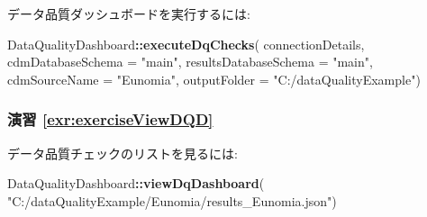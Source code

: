 \documentclass[
  11pt]{book}
\newenvironment{Shaded}{\begin{snugshade}}{\end{snugshade}}
\newcommand{\AttributeTok}[1]{\textcolor[rgb]{0.13,0.29,0.53}{#1}}
\newcommand{\FunctionTok}[1]{\textcolor[rgb]{0.13,0.29,0.53}{\textbf{#1}}}
\newcommand{\NormalTok}[1]{#1}
\newcommand{\SpecialCharTok}[1]{\textcolor[rgb]{0.81,0.36,0.00}{\textbf{#1}}}
\newcommand{\StringTok}[1]{\textcolor[rgb]{0.31,0.60,0.02}{#1}}
\theoremstyle{definition}
\theoremstyle{definition}
\theoremstyle{definition}
\theoremstyle{definition}
\theoremstyle{remark}
\begin{document}
データ品質ダッシュボードを実行するには:

\begin{Shaded}
\begin{Highlighting}[]
\NormalTok{DataQualityDashboard}\SpecialCharTok{::}\FunctionTok{executeDqChecks}\NormalTok{(}
\NormalTok{  connectionDetails,}
  \AttributeTok{cdmDatabaseSchema =} \StringTok{"main"}\NormalTok{,}
  \AttributeTok{resultsDatabaseSchema =} \StringTok{"main"}\NormalTok{,}
  \AttributeTok{cdmSourceName =} \StringTok{"Eunomia"}\NormalTok{,}
  \AttributeTok{outputFolder =} \StringTok{"C:/dataQualityExample"}\NormalTok{)}
\end{Highlighting}
\end{Shaded}

\subsubsection*{演習 \ref{exr:exerciseViewDQD}}\label{ux6f14ux7fd2-refexrexerciseviewdqd}

データ品質チェックのリストを見るには:

\begin{Shaded}
\begin{Highlighting}[]
\NormalTok{DataQualityDashboard}\SpecialCharTok{::}\FunctionTok{viewDqDashboard}\NormalTok{(}
  \StringTok{"C:/dataQualityExample/Eunomia/results\_Eunomia.json"}\NormalTok{)}
\end{Highlighting}
\end{Shaded}

\section{}\label{section}

  

\backmatter
\printindex
\end{document}
